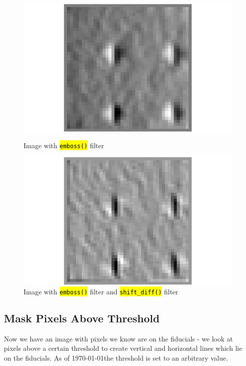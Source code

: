 \documentclass[10pt]{article}
\begin{document}
    \begin{figure}[h]
        \begin{minipage}{0.4\textwidth}
            \begin{center}
                \includegraphics[width=.75\linewidth]{plots_tables_images/emboss.png}
                \caption{Image with \hl{\texttt{emboss()}} filter}
            \end{center}
        \end{minipage}
        \begin{minipage}{0.4\textwidth}
            \begin{center}
                \includegraphics[width=.75\linewidth]{plots_tables_images/shiftdiff.png}
                \caption{Image with \hl{\texttt{emboss()}} filter and \hl{\texttt{shift\_diff()}} filter}
            \end{center}
        \end{minipage}
    \end{figure}

    \subsection{Mask Pixels Above Threshold} %
    \label{sub:mask_pixels_above_threshold}
    Now we have an image with pixels we know are on the fiducials - we look at pixels above a certain threshold to create vertical and horizontal lines which lie on the fiducials. As of \today the threshold is set to an arbitrary value. 
\end{document}
